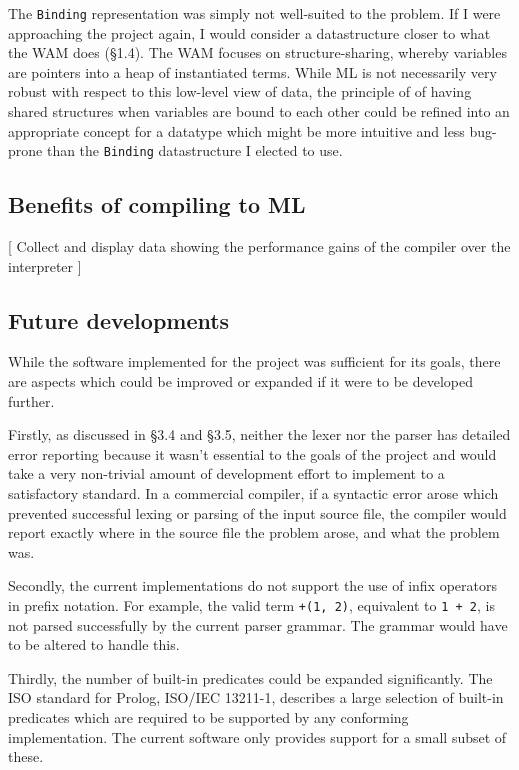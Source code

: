 \documentclass[12pt]{article}
\begin{document}
The \verb|Binding| representation was simply not well-suited to the problem. 
If I were approaching the project again, I would consider a datastructure closer to what the WAM does (\S1.4). 
The WAM focuses on structure-sharing, whereby variables are pointers into a heap of instantiated terms. 
While ML is not necessarily very robust with respect to this low-level view of data, the principle of of having shared structures when variables are bound to each other could be refined into an appropriate concept for a datatype which might be more intuitive and less bug-prone than the \verb|Binding| datastructure I elected to use.

\subsection{Benefits of compiling to ML}

[ Collect and display data showing the performance gains of the compiler over the interpreter ]

\subsection{Future developments}

While the software implemented for the project was sufficient for its goals, there are aspects which could be improved or expanded if it were to be developed further.

Firstly, as discussed in \S3.4 and \S3.5, neither the lexer nor the parser has detailed error reporting because it wasn't essential to the goals of the project and would take a very non-trivial amount of development effort to implement to a satisfactory standard. 
In a commercial compiler, if a syntactic error arose which prevented successful lexing or parsing of the input source file, the compiler would report exactly where in the source file the problem arose, and what the problem was.

Secondly, the current implementations do not support the use of infix operators in prefix notation. 
For example, the valid term \verb|+(1, 2)|, equivalent to \verb|1 + 2|, is not parsed successfully by the current parser grammar. 
The grammar would have to be altered to handle this.

Thirdly, the number of built-in predicates could be expanded significantly. 
The ISO standard for Prolog, ISO/IEC 13211-1, describes a large selection of built-in predicates which are required to be supported by any conforming implementation. 
The current software only provides support for a small subset of these.
\end{document}
